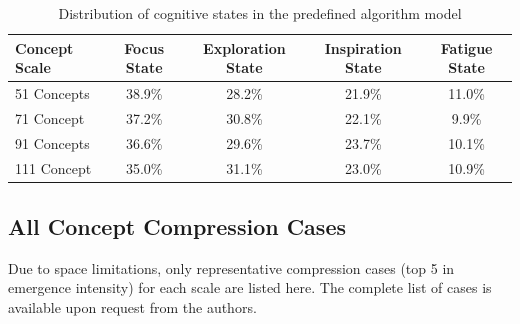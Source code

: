 \documentclass[10pt,onecolumn]{article}
\begin{document}
\begin{table}[H]
\footnotesize
\centering
\caption{Distribution of cognitive states in the predefined algorithm model}
\label{tab:app_state_dist}
\begin{tabular}{lcccc}
\toprule
\textbf{Concept Scale} & \textbf{Focus State} & \textbf{Exploration State} & \textbf{Inspiration State} & \textbf{Fatigue State} \\
\midrule
51 Concepts & 38.9\% & 28.2\% & 21.9\% & 11.0\% \\
71 Concept & 37.2\% & 30.8\% & 22.1\% & 9.9\% \\
91 Concepts & 36.6\% & 29.6\% & 23.7\% & 10.1\% \\
111 Concept & 35.0\% & 31.1\% & 23.0\% & 10.9\% \\
\bottomrule
\end{tabular}
\end{table}

\subsection{All Concept Compression Cases}

Due to space limitations, only representative compression cases (top 5 in emergence intensity) for each scale are listed here. The complete list of cases is available upon request from the authors.
\end{document}

